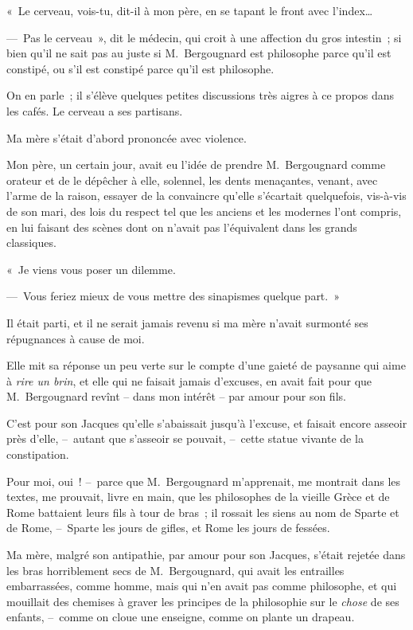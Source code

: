 \documentclass[french,twoside]{book} %
\begin{document}
« Le cerveau, vois-tu, dit-il à mon père, en se tapant le front avec l’index…\par
— Pas le cerveau », dit le médecin, qui croit à une affection du gros intestin ; si bien qu’il ne sait pas au juste si M. Bergougnard est philosophe parce qu’il est constipé, ou s’il est constipé parce qu’il est philosophe.\par
On en parle ; il s’élève quelques petites discussions très aigres à ce propos dans les cafés. Le cerveau a ses partisans.\par
Ma mère s’était d’abord prononcée avec violence.\par
Mon père, un certain jour, avait eu l’idée de prendre M. Bergougnard comme orateur et de le dépêcher à elle, solennel, les dents menaçantes, venant, avec l’arme de la raison, essayer de la convaincre qu’elle s’écartait quelquefois, vis-à-vis de son mari, des lois du respect tel que les anciens et les modernes l’ont compris, en lui faisant des scènes dont on n’avait pas l’équivalent dans les grands classiques.\par
« Je viens vous poser un dilemme.\par
— Vous feriez mieux de vous mettre des sinapismes quelque part. »\par
Il était parti, et il ne serait jamais revenu si ma mère n’avait surmonté ses répugnances à cause de moi.\par
Elle mit sa réponse un peu verte sur le compte d’une gaieté de paysanne qui aime à \emph{rire un brin}, et elle qui ne faisait jamais d’excuses, en avait fait pour que M. Bergougnard revînt – dans mon intérêt – par amour pour son fils.\par
C’est pour son Jacques qu’elle s’abaissait jusqu’à l’excuse, et faisait encore asseoir près d’elle, – autant que s’asseoir se pouvait, – cette statue vivante de la constipation.\par
Pour moi, oui ! – parce que M. Bergougnard m’apprenait, me montrait dans les textes, me prouvait, livre en main, que les philosophes de la vieille Grèce et de Rome battaient leurs fils à tour de bras ; il rossait les siens au nom de Sparte et de Rome, – Sparte les jours de gifles, et Rome les jours de fessées.\par
Ma mère, malgré son antipathie, par amour pour son Jacques, s’était rejetée dans les bras horriblement secs de M. Bergougnard, qui avait les entrailles embarrassées, comme homme, mais qui n’en avait pas comme philosophe, et qui mouillait des chemises à graver les principes de la philosophie sur le \emph{chose} de ses enfants, – comme on cloue une enseigne, comme on plante un drapeau.\par
\end{document}
